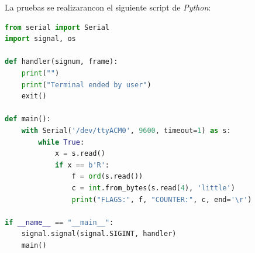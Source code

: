 \documentclass[
    11pt,
    spanish,
	a4paper
]{article}
\begin{document}
La pruebas se realizarancon el siguiente script de \emph{Python}:

\begin{lstlisting}[language=Python]
from serial import Serial
import signal, os

def handler(signum, frame):
    print("")
    print("Terminal ended by user")
    exit()

def main():
    with Serial('/dev/ttyACM0', 9600, timeout=1) as s:
        while True:
            x = s.read()
            if x == b'R':
                f = ord(s.read())
                c = int.from_bytes(s.read(4), 'little')
                print("FLAGS:", f, "COUNTER:", c, end='\r')

if __name__ == "__main__":
    signal.signal(signal.SIGINT, handler)
    main()
\end{lstlisting}
\end{document}
